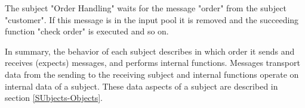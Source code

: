 The subject "Order Handling" waits for the message "order" from the subject "customer". If this message is in the input pool it is removed and the succeeding function "check order" is executed and so on.

In summary, the behavior of each subject describes in which order it sends and receives (expects) messages, and performs internal functions. Messages transport data from the sending to the receiving subject and internal functions operate on internal data of a subject. These data aspects of a subject are described in section \ref{SUbjects-Objects}. 






